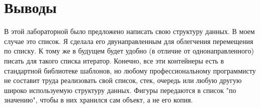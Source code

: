 \section{Выводы}

В этой лабораторной было предложено написать свою структуру данных. В моем случае это список. Я сделала его двунаправленным для облегчения перемещения по списку. К тому же в будущем будет удобно (в отличие от однонаправленного) писать для такого списка итератор. Конечно, все эти контейнеры есть в стандартной библиотеке шаблонов, но любому профессиональному программисту не составит труда реализовать свой список, стек, очередь или любую другую широко используемую структуру данных. Фигуры передаются в список "по значению", чтобы в них хранился сам объект, а не его копия.

\pagebreak